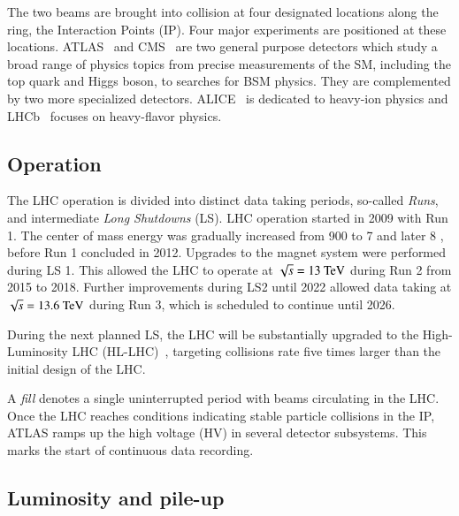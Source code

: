 The two beams are brought into collision at four designated locations along the ring, the Interaction Points (IP).
Four major experiments are positioned at these locations.
ATLAS~\cite{PERF-2007-01} and CMS~\cite{CMS-CMS-00-001} are two general purpose detectors which
study a broad range of physics topics from precise measurements of the SM, including the top quark and Higgs boson,
to searches for BSM physics.
They are complemented by two more specialized detectors.
ALICE~\cite{ALICE-TDR} is dedicated to heavy-ion physics and LHCb~\cite{LHCb-TDR} focuses on heavy-flavor physics.

\subsection{Operation}

The LHC operation is divided into distinct data taking periods, so-called \textit{Runs}, and intermediate \textit{Long Shutdowns} (LS). LHC operation started in 2009 with Run 1. The center of mass energy was gradually increased from 900 \GeV to 7 \TeV and later 8 \TeV, before Run 1 concluded in 2012.
Upgrades to the magnet system were performed during LS 1. This allowed the LHC to operate at $\sqrt{s} = 13 ~\text{TeV}$ during Run 2 from 2015 to 2018. Further improvements during LS2 until 2022 allowed data taking at $\sqrt{s} = 13.6 ~\text{TeV}$ during Run 3, which is scheduled to continue until 2026.

During the next planned LS, the LHC will be substantially upgraded to the High-Luminosity LHC (HL-LHC)~\cite{HLLHC_TDR}, targeting collisions rate five times larger than the initial design of the LHC.

A \textit{fill} denotes a single uninterrupted period with beams circulating in the LHC.
Once the LHC reaches conditions indicating stable particle collisions in the IP, ATLAS ramps up the high voltage (HV) in several detector subsystems. This marks the start of continuous data recording.


\subsection{Luminosity and pile-up}

